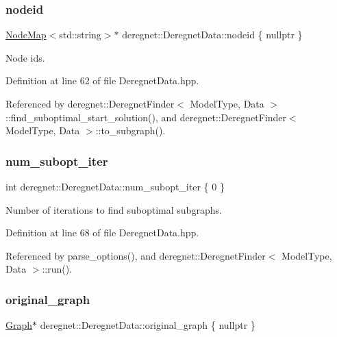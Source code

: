 \subsubsection{\texorpdfstring{nodeid}{nodeid}}
{\footnotesize\ttfamily \hyperlink{namespacederegnet_ae102b707ae1d6f83c639ece5e0dd5658}{Node\+Map}$<$std\+::string$>$$\ast$ deregnet\+::\+Deregnet\+Data\+::nodeid \{ nullptr \}}



Node id\textquotesingle{}s. 



Definition at line 62 of file Deregnet\+Data.\+hpp.



Referenced by deregnet\+::\+Deregnet\+Finder$<$ Model\+Type, Data $>$\+::find\+\_\+suboptimal\+\_\+start\+\_\+solution(), and deregnet\+::\+Deregnet\+Finder$<$ Model\+Type, Data $>$\+::to\+\_\+subgraph().

\mbox{\label{classderegnet_1_1DeregnetData_adb7428cd99112156ae9f80187af9ebbe}} 
\subsubsection{\texorpdfstring{num\+\_\+subopt\+\_\+iter}{num\_subopt\_iter}}
{\footnotesize\ttfamily int deregnet\+::\+Deregnet\+Data\+::num\+\_\+subopt\+\_\+iter \{ 0 \}}



Number of iterations to find suboptimal subgraphs. 



Definition at line 68 of file Deregnet\+Data.\+hpp.



Referenced by parse\+\_\+options(), and deregnet\+::\+Deregnet\+Finder$<$ Model\+Type, Data $>$\+::run().

\mbox{\label{classderegnet_1_1DeregnetData_a3ea2abe9900785d80fa0141afdd985a9}} 
\subsubsection{\texorpdfstring{original\+\_\+graph}{original\_graph}}
{\footnotesize\ttfamily \hyperlink{namespacederegnet_a55b76c55bbabc682cbc61f8b9948799e}{Graph}$\ast$ deregnet\+::\+Deregnet\+Data\+::original\+\_\+graph \{ nullptr \}}



